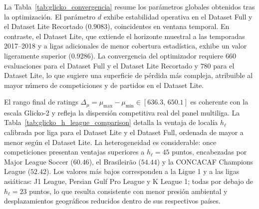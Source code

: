 La Tabla~\ref{tab:glicko_convergencia} resume los par\'ametros globales obtenidos tras la optimizaci\'on. El par\'ametro $d$ exhibe estabilidad operativa en el Dataset Full y el Dataset Lite Recortado ($0{.}9083$), coincidentes en ventana temporal. En contraste, el Dataset Lite, que extiende el horizonte muestral a las temporadas 2017--2018 y a ligas adicionales de menor cobertura estad\'istica, exhibe un valor ligeramente superior ($0{.}9286$). La convergencia del optimizador requiere $660$ evaluaciones para el Dataset Full y el Dataset Lite Recortado y $780$ para el Dataset Lite, lo que sugiere una superficie de p\'erdida m\'as compleja, atribuible al mayor n\'umero de competiciones y de partidos en el Dataset Lite.



El rango final de ratings $\Delta_\mu=\mu_\text{max}-\mu_\text{min}\in [636{.}3,\,650{.}1]$ es coherente con la escala Glicko-2 y refleja la dispersi\'on competitiva real del panel multiliga. La Tabla~\ref{tab:glicko_h_league_comparison} detalla la ventaja de local\'ia $h_\ell$ calibrada por liga para el Dataset Lite y el Dataset Full, ordenada de mayor a menor seg\'un el Dataset Lite. La heterogeneidad es considerable: once competiciones presentan ventajas superiores a $h_\ell=45$ puntos, encabezadas por Major League Soccer ($60{.}46$), el Brasileir\~ao ($54{.}44$) y la CONCACAF Champions League ($52{.}42$). Los valores m\'as bajos corresponden a la Ligue 1 y a las ligas asi\'aticas: J1 League, Persian Gulf Pro League y K League 1; todas por debajo de $h_\ell=23$ puntos, lo que resulta consistente con menor presi\'on ambiental y desplazamientos geogr\'aficos reducidos dentro de sus respectivos pa\'ises.

